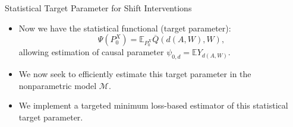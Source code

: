 \documentclass{beamer}
\newcommand{\E}{\mathbb{E}}
\newcommand{\M}{\mathcal{M}}
\begin{document}

\begin{frame}[c]{Statistical Target Parameter for Shift Interventions}

\begin{center}
\begin{itemize}
  \itemsep10pt
  \item Now we have the statistical functional (target parameter):
    \begin{equation*}
      \Psi(P_0^X) = \E_{P_0^X}{\overline{Q}(d(A, W), W)},
    \end{equation*}
    allowing estimation of causal parameter $\psi_{0,d} = \E Y_{d(A, W)}$.
  \item We now seek to efficiently estimate this target parameter in the
    nonparametric model $\M$.
  \item We implement a targeted minimum loss-based estimator of this statistical
    target parameter.
\end{itemize}
\end{center}


\end{frame}

\end{document}

